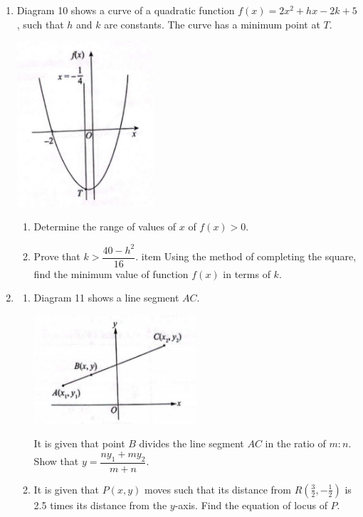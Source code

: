 \documentclass{report}
\begin{document}
\begin{enumerate}[leftmargin=*]
    \item Diagram 10 shows a curve of a quadratic function $f(x) = 2x^2 + hx - 2k + 5$,
          such that $h$ and $k$ are constants. The curve has a minimum point at $T$.
          \begin{center}
              \includegraphics[width=0.4\textwidth]{./assets/p1.14.png}
          \end{center}
          \begin{enumerate}
              \item Determine the range of values of $x$ of $f(x)>0$.
              \item Prove that $k>\dfrac{40-h^2}{16}$. item Using the method of completing the
                    square, find the minimum value of function $f(x)$ in terms of $k$.
          \end{enumerate}

    \item \begin{enumerate}
              \item Diagram 11 shows a line segment $AC$.
                    \begin{center}
                        \includegraphics[width=0.5\textwidth]{./assets/p1.15a.png}
                    \end{center}
                    It is given that point $B$ divides the line segment $A C$ in the ratio of $m: n$. Show that $y=\dfrac{n y_1+m y_2}{m+n}$.

              \item It is given that $P(x, y)$ moves such that its distance from
                    $R\left(\frac{3}{2},-\frac{1}{2}\right)$ is 2.5 times its distance from the
                    $y$-axis. Find the equation of locus of $P$.
          \end{enumerate}
\end{enumerate}
\end{document}
